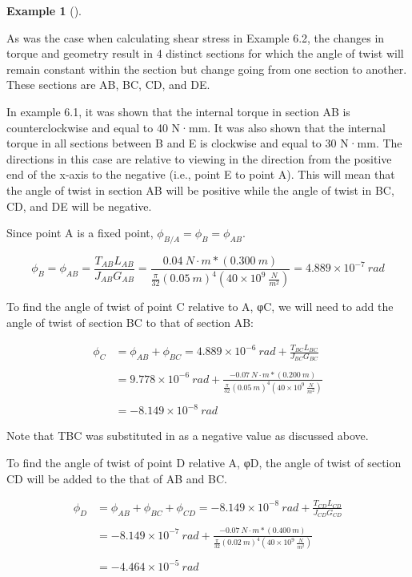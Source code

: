 \documentclass[
  letterpaper,
  DIV=11,
  numbers=noendperiod]{scrreprt}
\theoremstyle{definition}
\newtheorem{example}{Example}[chapter]
\theoremstyle{remark}
\begin{document}
\begin{tcolorbox}
\begin{example}[]
\begin{tcolorbox}
As was the case when calculating shear stress in Example 6.2, the
changes in torque and geometry result in 4 distinct sections for which
the angle of twist will remain constant within the section but change
going from one section to another. These sections are AB, BC, CD, and
DE.

In example 6.1, it was shown that the internal torque in section AB is
counterclockwise and equal to 40 N·mm. It was also shown that the
internal torque in all sections between B and E is clockwise and equal
to 30 N·mm. The directions in this case are relative to viewing in the
direction from the positive end of the x-axis to the negative (i.e.,
point E to point A). This will mean that the angle of twist in section
AB will be positive while the angle of twist in BC, CD, and DE will be
negative.

Since point A is a fixed point, \(\phi_{B / A}=\phi_B=\phi_{A B}\).

\[
\phi_B=\phi_{A B}=\frac{T_{AB}L_{AB}}{J_{AB}G_{AB}}=\frac{0.04{~N}\cdot{m}*(0.300{~m})}{\frac{\pi}{32}(0.05{~m})^4\left(40 \times 10^9~\frac{N}{{m}^2}\right)}=4.889 \times 10^{-7}{~rad}
\]

To find the angle of twist of point C relative to A, φC, we will need to
add the angle of twist of section BC to that of section AB:

\[
\begin{aligned}
\phi_C&=\phi_{A B}+\phi_{BC}=4.889\times 10^{-6}{~rad}+\frac{T_{BC}L_{BC}}{J_{BC}G_{BC}} \\
\\
&=9.778\times10^{-6}{~rad}+\frac{-0.07{~N}\cdot{m}*(0.200{~m})}{\frac{\pi}{32}(0.05{~m})^4\left(40 \times 10^9~\frac{{N}}{{m}^2}\right)} \\
\\
&=-8.149 \times 10^{-8}{~rad}
\end{aligned}
\]

Note that TBC was substituted in as a negative value as discussed above.

To find the angle of twist of point D relative A, φD, the angle of twist
of section CD will be added to the that of AB and BC.

\[
\begin{aligned}
\phi_D&=\phi_{AB}+\phi_{BC}+\phi_{CD}=-8.149\times10^{-8} {~rad}+\frac{T_{CD}L_{CD}}{J_{CD}G_{CD}} \\
\\
&=-8.149 \times 10^{-7}{~rad}+\frac{-0.07{~N}\cdot{m}*(0.400{~m})}{\frac{\pi}{32}(0.02{~m})^4\left(40 \times 10^9~\frac{{N}}{{m}^2}\right)} \\
\\
&=-4.464 \times 10^{-5} {~rad}
\end{aligned}
\]


\end{tcolorbox}
\end{example}
\end{tcolorbox}
\end{document}
